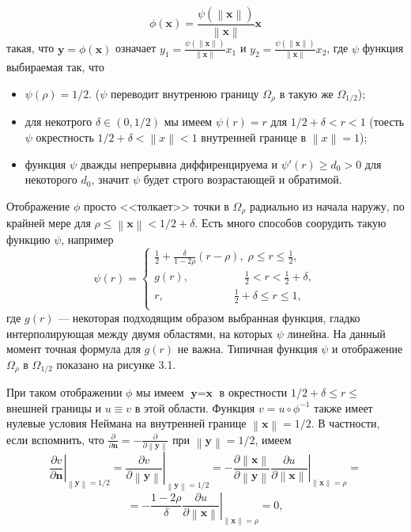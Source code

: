 \documentclass[a4paper, 12pt]{article}
\newcommand{\norm}[1]{\left\lVert#1\right\rVert}
\begin{document}
\begin{equation}\label{e37}
\phi(\textbf{x}) = \frac{\psi(\norm{\textbf{x}})}{\norm{\textbf{x}}}\textbf{x}
\end{equation} 
такая, что $\textbf{y} = \phi(\textbf{x})$ означает $y_1 = \frac{\psi(\norm{\textbf{x}})}
{\norm{\textbf{x}}}x_1$ и $y_2 = \frac{\psi(\norm{\textbf{x}})}
{\norm{\textbf{x}}}x_2$, где $\psi$ функция выбираемая так, что
\begin{itemize}
\item $\psi(\rho) = 1/2$. ($\psi$ переводит внутренюю границу $\Omega_{\rho}$ в такую же $\Omega_{1/2}$);
\item для некотрого $\delta \in (0, 1/2)$  мы имеем $\psi(r) = r$ для $1/2 + \delta < r < 1$ (тоесть $\psi$
окрестность $1/2 + \delta < \norm{x} < 1$ внутренней границе в $\norm{x} = 1$);
\item функция $\psi$ дважды непрерывна диффиренцируема и $\psi'(r) \geq d_0 > 0$ для некоторого $d_0$, значит $\psi$ будет строго возрастающей и обратимой.
\end{itemize}
Отображение $\phi$ просто <<толкает>> точки в $\Omega_{\rho}$ радиально из начала
наружу, по крайней мере для $\rho \le \norm{\textbf{x}} < 1/2 + \delta$. Есть много
способов соорудить такую функцию $\psi$, например 
\begin{equation}\label{psi}
\psi(r) = 
\begin{cases}
\frac{1}{2} + \frac{\delta}{1-2\rho}(r-\rho), \;\rho \le r \le \frac{1}{2},\\
g(r), \quad \quad \quad \quad \quad \frac{1}{2} < r < \frac{1}{2} + \delta,\\
r, \; \quad \quad \quad \quad \quad \quad \frac{1}{2} + \delta \le r \le 1,\\
\end{cases}
\end{equation}
где $g(r)$ --- некоторая подходящим образом выбранная функция, гладко интерполирующая
между двумя областями, на которых $\psi$ линейна. На данный момент точная формула для
$g(r)$ не важна. Типичная функция $\psi$ и отображение $\Omega_{\rho}$ в
$\Omega_{1/2}$ показано на рисунке 3.1.

При таком отображении $\phi$ мы имеем $\textbf{y} = \textbf{x}$ в окрестности
$1/2 + \delta \le r \le$ внешней границы и $u \equiv v$ в этой области. Функция 
$v = u\circ \phi^{-1}$ также имеет нулевые условия Неймана на внутренней границе 
$\norm{\textbf{x}} = 1/2$. В частности, если вспомнить, что $\frac{\partial
}{\partial \textbf{n}} = - \frac{\partial}{\partial \norm{\textbf{y}}}$
при $\norm{\textbf{y}} = 1/2$, имеем
\begin{equation*}
\left.\frac{\partial v}{\partial \textbf{n}}\right|_{\norm{\textbf{y}}=1/2} = 
\left.\frac{\partial v}{\partial \norm{\textbf{y}}}\right|_{\norm{\textbf{y}}=1/2} =
-\frac{\partial \norm{\textbf{x}}}{\partial \norm{\textbf{y}}} 
\left.\frac{\partial u}{\partial \norm{\textbf{x}}}\right|_{\norm{\textbf{x}}=\rho} =
\end{equation*}  
\begin{equation*}
= -\frac{1-2\rho}{\delta} \left.\frac{\partial u}{\partial \norm{\textbf{x}}}
\right|_{\norm{\textbf{x}}=\rho} = 0,
\end{equation*}
\end{document}
